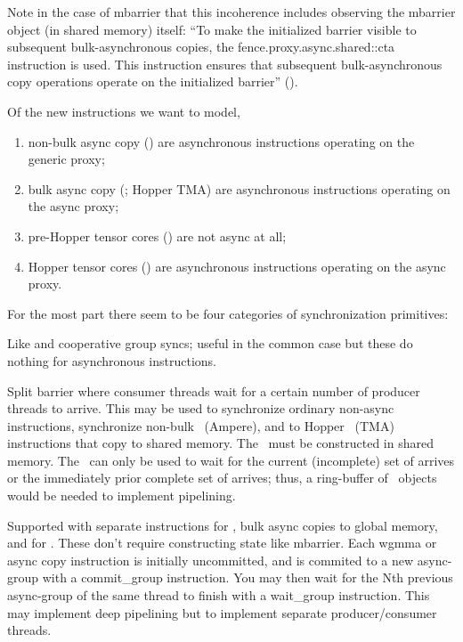 Note in the case of mbarrier that this incoherence includes observing the mbarrier object (in shared memory) itself: ``To make the initialized barrier visible to subsequent bulk-asynchronous copies, the fence.proxy.async.shared::cta instruction is used. This instruction ensures that subsequent bulk-asynchronous copy operations operate on the initialized barrier'' ().

\filbreak
Of the new instructions we want to model,

\begin{enumerate}
  \item non-bulk async copy (\cpAsync) are asynchronous instructions operating on the generic proxy;
  \item bulk async copy (\cpAsyncBulk; Hopper TMA) are asynchronous instructions operating on the async proxy;
  \item pre-Hopper tensor cores () are not async at all;
  \item Hopper tensor cores (\wgmma) are asynchronous instructions operating on the async proxy.
\end{enumerate}

\filbreak
For the most part there seem to be four categories of synchronization primitives:

\filbreak
{} Like  and cooperative group syncs; useful in the common case but these do nothing for asynchronous instructions.

\filbreak
{} Split barrier where consumer threads wait for a certain number of producer threads to arrive.
This may be used to synchronize ordinary non-async instructions, synchronize non-bulk \cpAsync\ (Ampere), and to Hopper \cpAsyncBulk\ (TMA) instructions that copy to shared memory.
The \mbarrier\ must be constructed in shared memory.
The \mbarrier\ can only be used to wait for the current (incomplete) set of arrives or the immediately prior complete set of arrives; thus, a ring-buffer of \mbarrier\ objects would be needed to implement pipelining.

\filbreak
{} Supported with separate instructions for , bulk async copies to global memory, and for .
These don't require constructing state like mbarrier.
Each wgmma or async copy instruction is initially uncommitted, and is commited to a new async-group with a commit\_group instruction.
You may then wait for the Nth previous async-group of the same thread to finish with a wait\_group instruction.
This may implement deep pipelining but  to implement separate producer/consumer threads.

